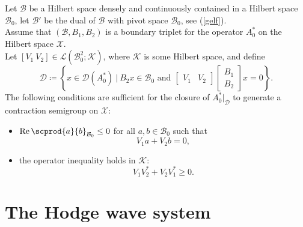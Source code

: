 \documentclass{ifacconf}
\newcommand{\Real}{\operatorname{Re}}
\begin{document}
\begin{thm}\label{generation}
    Let $\mathcal{B}$ be a Hilbert space densely and continuously contained in a Hilbert space $\mathcal{B}_0$, let $\mathcal{B}'$ be the dual of $\mathcal{B}$ with pivot space $\mathcal{B}_0$, see (\ref{gelf}).\\
    Assume that $(\mathcal{B},B_1,B_2)$ is a boundary triplet for the operator $A_0^*$ on the Hilbert space $\mathcal{X}$.\\
    Let $[V_1\ V_2]\in \mathcal{L}(\mathcal{B}^2_0;\mathcal{K})$, where $\mathcal{K}$ is some Hilbert space, and define
    \[
        \mathcal{D}\coloneqq\left\{x\in\mathcal{D}(A_0^*)\ |\ B_2x\in\mathcal{B}_0\text{ and } \begin{bmatrix}
            V_1 & V_2
        \end{bmatrix}\begin{bmatrix}
            B_1\\
            B_2
        \end{bmatrix}x=0 \right\}.
    \]
    The following conditions are sufficient for the closure of $A_0^*|_{\mathcal{D}}$ to generate a contraction semigroup on $\mathcal{X}$:
    \begin{itemize}
        \item $\Real \scprod{a}{b}_{\mathcal{B}_0}\leq 0$ for all $a,b\in\mathcal{B}_0$ such that
        \[
            V_1a+V_2b=0,
        \]
        \item the operator inequality holds in $\mathcal{K}$:
        \[
            V_1V_2^*+V_2V_1^*\geq 0.
        \]
    \end{itemize}
\end{thm}


\section{The Hodge wave system}
\end{document}
